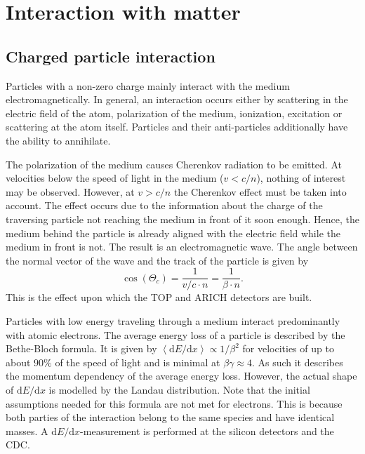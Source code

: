 \section{Interaction with matter}
\label{sec:interaction_with_matter}

\subsection{Charged particle interaction}
\label{subsec:interaction_with_matter}

Particles with a non-zero charge mainly interact with the medium electromagnetically. In general, an interaction occurs either by scattering in the electric field of the atom, polarization of the medium, ionization, excitation or scattering at the atom itself. Particles and their anti-particles additionally have the ability to annihilate.

The polarization of the medium causes Cherenkov radiation to be emitted. At velocities below the speed of light in the medium ($v < c/n$), nothing of interest may be observed. However, at $v > c/n$ the Cherenkov effect must be taken into account. The effect occurs due to the information about the charge of the traversing particle not reaching the medium in front of it soon enough. Hence, the medium behind the particle is already aligned with the electric field while the medium in front is not. The result is an electromagnetic wave. The angle between the normal vector of the wave and the track of the particle is given by
\begin{equation}
	\cos(\Theta_{c}) = \frac{1}{v/c \cdot n} = \frac{1}{\beta \cdot n}
	\mathrm{.}
\end{equation}
This is the effect upon which the TOP and ARICH detectors are built.

Particles with low energy traveling through a medium interact predominantly with atomic electrons. The average energy loss of a particle is described by the Bethe-Bloch formula. It is given by $\left< \mathrm{d}E/\mathrm{d}x \right> \propto 1/{\beta^2}$ for velocities of up to about $90\%$ of the speed of light and is minimal at $\beta \gamma \approx 4$. As such it describes the momentum dependency of the average energy loss. However, the actual shape of $\mathrm{d}E/\mathrm{d}x$ is modelled by the Landau distribution. Note that the initial assumptions needed for this formula are not met for electrons. This is because both parties of the interaction belong to the same species and have identical masses.
A $\mathrm{d}E/\mathrm{d}x$-measurement is performed at the silicon detectors and the CDC.

